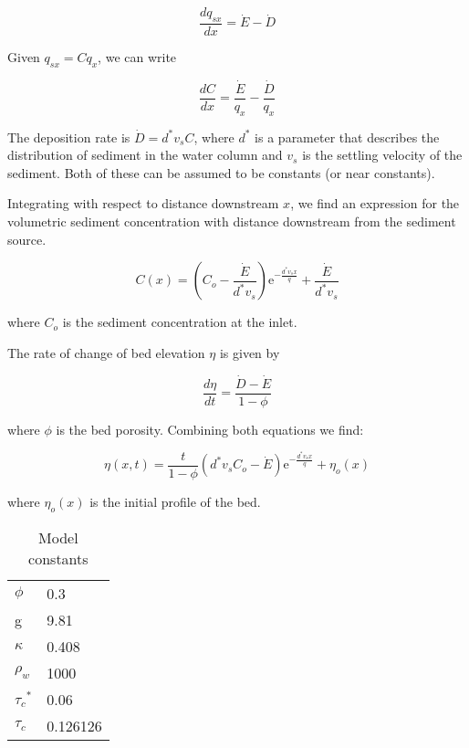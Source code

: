 \documentclass[11pt]{article}
\newcommand{\me}{\mathrm{e}}
\begin{document}
\begin{equation}
\frac{dq_{sx}}{dx} = \dot{E} - \dot{D}
\end{equation}

Given $q_{sx} = Cq_x$, we can write

\begin{equation}
\frac{dC}{dx} = \frac{\dot{E}}{q_x} - \frac{\dot{D}}{q_x}
\end{equation}

The deposition rate is $\dot{D} = d^*v_sC$, where $d^*$ is a parameter that describes the distribution of sediment in the water column and $v_s$ is the settling velocity of the sediment. Both of these can be assumed to be constants (or near constants).

Integrating with respect to distance downstream $x$, we find an expression for the volumetric sediment concentration with distance downstream from the sediment source.

\begin{equation}
C(x) = \left(C_o - \frac{\dot{E}}{d^*v_s}\right)\me^{-\frac{d^* v_s x}{q}} + \frac{\dot{E}}{d^* v_s}
\end{equation}

\noindent where $C_o$ is the sediment concentration at the inlet.

The rate of change of bed elevation $\eta$ is given by

\begin{equation}
\frac{d\eta}{dt} = \frac{\dot{D} - \dot{E}}{1 - \phi}
\end{equation}

\noindent where $\phi$ is the bed porosity. Combining both equations we find:

\begin{equation}
\eta(x,t) = \frac{t}{1-\phi} \left(d^* v_s C_o - \dot{E}\right) \me^{-\frac{d^* v_s x}{q}} + \eta_o(x)
\end{equation}

\noindent where $\eta_o(x)$ is the initial profile of the bed.

\begin{table}[]
\centering
\caption{Model constants}
\label{table:model_params}
\begin{tabular}{ll}
$\phi$ & 0.3 \\
g & 9.81 \\
$\kappa$ & 0.408 \\
$\rho_w$ & 1000 \\
${\tau_c}^*$ & 0.06 \\
${\tau_c}$ & 0.126126
\end{tabular}
\end{table}
\end{document}
